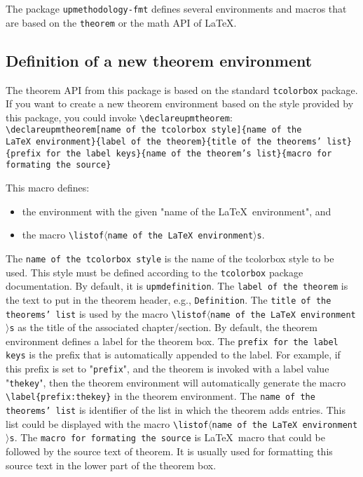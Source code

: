 \documentclass[book,taskpackage,specpackage,codepackage]{upmethodology-document}
\begin{document}
The package \texttt{upmethodology-fmt} defines several environments and macros that are based on the \texttt{theorem} or the math API of \LaTeX.

\subsection{Definition of a new theorem environment}

The theorem API from this package is based on the standard \texttt{tcolorbox} package.
If you want to create a new theorem environment based on the style provided by this package, you could invoke \texttt{{\textbackslash}declareupmtheorem}: \\
\texttt{{\textbackslash}declareupmtheorem[name of the tcolorbox style]\{name of the \LaTeX\ environment\}\{label of the theorem\}\{title of the theorems' list\}\{prefix for the label keys\}\{name of the theorem's list\}\{macro for formating the source\}}

This macro defines:
\begin{itemize}
\item the environment with the given "name of the \LaTeX\ environment", and
\item the macro \texttt{{\textbackslash}listof$\langle$name of the \LaTeX\ environment$\rangle$s}.
\end{itemize}

The \texttt{name of the tcolorbox style} is the name of the tcolorbox style to be used. This style must be defined according to the \texttt{tcolorbox} package documentation. By default, it is \texttt{upmdefinition}.
The \texttt{label of the theorem} is the text to put in the theorem header, e.g., \texttt{Definition}.
The \texttt{title of the theorems' list} is used by the macro \texttt{{\textbackslash}listof$\langle$name of the \LaTeX\ environment$\rangle$s} as the title of the associated chapter/section.
By default, the theorem environment defines a label for the theorem box. The \texttt{prefix for the label keys} is the prefix that is automatically appended to the label. For example, if this prefix is set to "\texttt{prefix}", and the theorem is invoked with a label value "\texttt{thekey}", then the theorem environment will automatically generate the macro \texttt{{\textbackslash}label\{prefix:thekey\}} in the theorem environment.
The \texttt{name of the theorems' list} is identifier of the list in which the theorem adds entries. This list could be displayed with the macro \texttt{{\textbackslash}listof$\langle$name of the \LaTeX\ environment$\rangle$s}.
The \texttt{macro for formating the source} is \LaTeX\ macro that could be followed by the source text of theorem. It is usually used for formatting this source text in the lower part of the theorem box.
\end{document}
